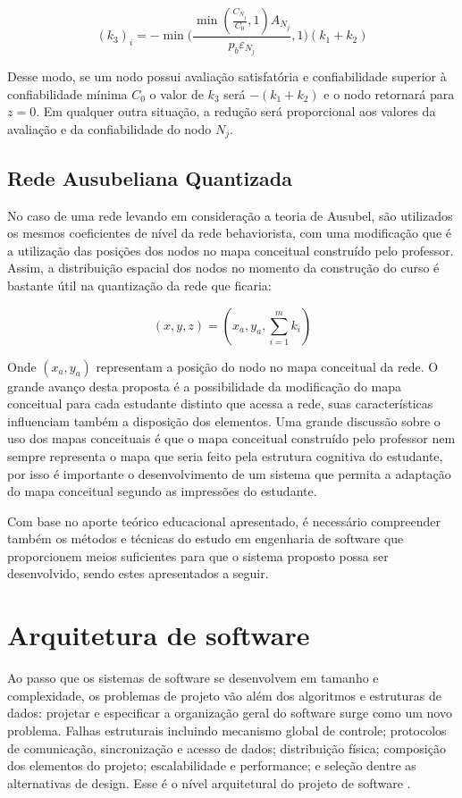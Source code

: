 \[
	(k_3)_i = - \min \Bigg(  \frac{\min( \frac{C_{N_j}}{C_0} , 1)A_{N_j}}{p_b\varepsilon_{N_j}} , 1  \Bigg)(k_1 + k_2)
\]

Desse modo, se um nodo possui avaliação satisfatória e confiabilidade superior à confiabilidade mínima \(C_0\) o valor de \(k_3\) será \(-(k_1+k_2)\) e o nodo retornará para \(z=0\). Em qualquer outra situação, a redução será proporcional aos valores da avaliação e da confiabilidade do nodo \(N_j\).

\subsection{Rede Ausubeliana Quantizada}

No caso de uma rede levando em consideração a teoria de Ausubel, são utilizados os mesmos coeficientes de nível da rede behaviorista, com uma modificação que é a utilização das posições dos nodos no mapa conceitual construído pelo professor. Assim, a distribuição espacial dos nodos no momento da construção do curso é bastante útil na quantização da rede que ficaria:

\begin{equation}
	(x,y,z)=(x_a,y_a,\sum_{i=1}^{m} k_i ) 
\end{equation}

Onde \((x_a,y_a)\) representam a posição do nodo no mapa conceitual da rede. O grande avanço desta proposta é a possibilidade da modificação do mapa conceitual para cada estudante distinto que acessa a rede, suas características influenciam também a disposição dos elementos. Uma grande discussão sobre o uso dos mapas conceituais é que o mapa conceitual construído pelo professor nem sempre representa o mapa que seria feito pela estrutura cognitiva do estudante, por isso é importante o desenvolvimento de um sistema que permita a adaptação do mapa conceitual segundo as impressões do estudante.

Com base no aporte teórico educacional apresentado, é necessário compreender também os métodos e técnicas do estudo em engenharia de software que proporcionem meios suficientes para que o sistema proposto possa ser desenvolvido, sendo estes apresentados a seguir.

\section{Arquitetura de software}

Ao passo que os sistemas de software se desenvolvem em tamanho e complexidade, os problemas de projeto vão além dos algoritmos e estruturas de dados: projetar e especificar a organização geral do software surge como um novo problema. Falhas estruturais incluindo mecanismo global de controle; protocolos de comunicação, sincronização e acesso de dados; distribuição física; composição dos elementos do projeto; escalabilidade e performance; e seleção dentre as alternativas de design. Esse é o nível arquitetural do projeto de software \cite{shaw1996}. 

